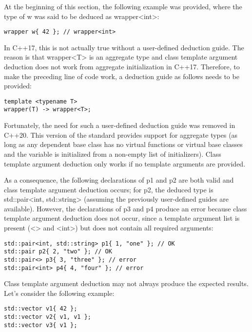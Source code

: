 At the beginning of this section, the following example was provided, where the type of w was said to be deduced as wrapper<int>:

\begin{lstlisting}[style=styleCXX]
wrapper w{ 42 }; // wrapper<int>
\end{lstlisting}

In C++17, this is not actually true without a user-defined deduction guide. The reason is that wrapper<T> is an aggregate type and class template argument deduction does not work from aggregate initialization in C++17. Therefore, to make the preceding line of code work, a deduction guide as follows needs to be provided:

\begin{lstlisting}[style=styleCXX]
template <typename T>
wrapper(T) -> wrapper<T>;
\end{lstlisting}

Fortunately, the need for such a user-defined deduction guide was removed in C++20. This version of the standard provides support for aggregate types (as long as any dependent base class has no virtual functions or virtual base classes and the variable is initialized from a non-empty list of initializers).
Class template argument deduction only works if no template arguments are provided.

As a consequence, the following declarations of p1 and p2 are both valid and class template argument deduction occurs; for p2, the deduced type is std::pair<int, std::string> (assuming the previously user-defined guides are available). However, the declarations of p3 and p4 produce an error because class template argument deduction does not occur, since a template argument list is present (<> and <int>) but does not contain all required arguments:

\begin{lstlisting}[style=styleCXX]
std::pair<int, std::string> p1{ 1, "one" }; // OK
std::pair p2{ 2, "two" }; // OK
std::pair<> p3{ 3, "three" }; // error
std::pair<int> p4{ 4, "four" }; // error
\end{lstlisting}

Class template argument deduction may not always produce the expected results. Let’s consider the following example:

\begin{lstlisting}[style=styleCXX]
std::vector v1{ 42 };
std::vector v2{ v1, v1 };
std::vector v3{ v1 };
\end{lstlisting}

